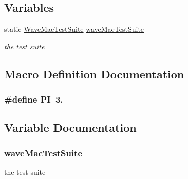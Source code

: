 \subsection*{Variables}
\begin{DoxyCompactItemize}
\item 
static \hyperlink{classWaveMacTestSuite}{Wave\+Mac\+Test\+Suite} \hyperlink{mac-extension-test-suite_8cc_a423629e1d28b7a594b71fde542f0b7fd}{wave\+Mac\+Test\+Suite}
\begin{DoxyCompactList}\small\item\em the test suite \end{DoxyCompactList}\end{DoxyCompactItemize}


\subsection{Macro Definition Documentation}
\subsubsection[{\texorpdfstring{PI}{PI}}]{\setlength{\rightskip}{0pt plus 5cm}\#define PI~3.}\hypertarget{mac-extension-test-suite_8cc_a598a3330b3c21701223ee0ca14316eca}{}\label{mac-extension-test-suite_8cc_a598a3330b3c21701223ee0ca14316eca}


\subsection{Variable Documentation}
\subsubsection[{\texorpdfstring{wave\+Mac\+Test\+Suite}{waveMacTestSuite}}]{ wave\+Mac\+Test\+Suite\hspace{0.3cm}{\ttfamily [static]}}\hypertarget{mac-extension-test-suite_8cc_a423629e1d28b7a594b71fde542f0b7fd}{}\label{mac-extension-test-suite_8cc_a423629e1d28b7a594b71fde542f0b7fd}


the test suite 

